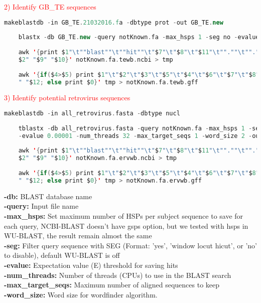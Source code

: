 \documentclass[a4paper,12pt]{article}
\begin{document}
	\noindent \textcolor{red}{2) Identify GB\_TE sequences}
	\begin{lstlisting}[language=scala]
	makeblastdb -in GB_TE.21032016.fa -dbtype prot -out GB_TE.new
	
	blastx -db GB_TE.new -query notKnown.fa -max_hsps 1 -seg no -evalue 0.00001 -num_threads 32 -max_target_seqs 1 -word_size 2 -outfmt 6 -out notKnown.fa.tewb.ncbi
	
	awk '{print $1"\t""blast""\t""hit""\t"$7"\t"$8"\t"$11"\t"".""\t"".""\t""Target sp|"
	$2" "$9" "$10}' notKnown.fa.tewb.ncbi > tmp
	
	awk '{if($4>$5) print $1"\t"$2"\t"$3"\t"$5"\t"$4"\t"$6"\t"$7"\t"$8"\t"$9" "$10" "$11
	" "$12; else print $0}' tmp > notKnown.fa.tewb.gff \end{lstlisting}
	
	\noindent \textcolor{red}{3) Identify potential retrovirus sequences}
	\begin{lstlisting}[language=scala]
	makeblastdb -in all_retrovirus.fasta -dbtype nucl 
	
	tblastx -db all_retrovirus.fasta -query notKnown.fa -max_hsps 1 -seg no \
	-evalue 0.00001 -num_threads 32 -max_target_seqs 1 -word_size 2 -outfmt 6 -out notKnown.fa.ervwb.ncbi
	
	awk '{print $1"\t""blast""\t""hit""\t"$7"\t"$8"\t"$11"\t"".""\t"".""\t""Target sp|"
	$2" "$9" "$10}' notKnown.fa.ervwb.ncbi > tmp
	
	awk '{if($4>$5) print $1"\t"$2"\t"$3"\t"$5"\t"$4"\t"$6"\t"$7"\t"$8"\t"$9" "$10" "$11
	" "$12; else print $0}' tmp > notKnown.fa.ervwb.gff \end{lstlisting}
	
	\noindent \textbf{-db:} BLAST database name \\
	\textbf{-query:} Input file name \\
	\textbf{-max\_hsps:} Set maximum number of HSPs per subject sequence to save for each query, NCBI-BLAST doesn't have gsps option, but we tested with hsps in WU-BLAST, the result remain almost the same \\
	\textbf{-seg:} Filter query sequence with SEG (Format: 'yes', 'window locut hicut', or 'no' to disable), default WU-BLAST is off \\
	\textbf{-evalue:} Expectation value (E) threshold for saving hits \\
	\textbf{-num\_threads:} Number of threads (CPUs) to use in the BLAST search \\
	\textbf{-max\_target\_seqs:} Maximum number of aligned sequences to keep \\
	\textbf{-word\_size:} Word size for wordfinder algorithm.
	
\end{document}
